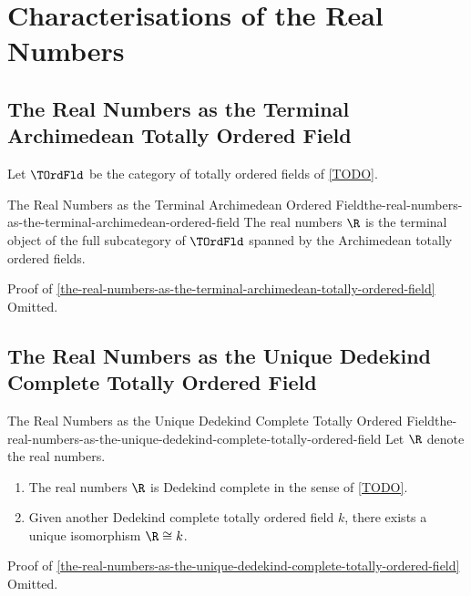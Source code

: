 \section{Characterisations of the Real Numbers}\label{section-characterisations-of-the-real-numbers}
\subsection{The Real Numbers as the Terminal Archimedean Totally Ordered Field}\label{subsection-the-real-numbers-as-the-terminal-archimedean-totally-ordered-field}
Let $\TOrdFld$ be the category of totally ordered fields of \cref{TODO}.
\begin{theorem}{The Real Numbers as the Terminal Archimedean Ordered Field}{the-real-numbers-as-the-terminal-archimedean-ordered-field}%
    The real numbers $\R$ is the terminal object of the full subcategory of $\TOrdFld$ spanned by the Archimedean totally ordered fields.
\end{theorem}
\begin{Proof}{Proof of \cref{the-real-numbers-as-the-terminal-archimedean-totally-ordered-field}}%
    Omitted.
\end{Proof}
\subsection{The Real Numbers as the Unique Dedekind Complete Totally Ordered Field}\label{subsection-the-real-numbers-as-the-unique-dedekind-complete-totally-ordered-field}
\begin{theorem}{The Real Numbers as the Unique Dedekind Complete Totally Ordered Field}{the-real-numbers-as-the-unique-dedekind-complete-totally-ordered-field}%
    Let $\R$ denote the real numbers.
    \begin{enumerate}
        \item\label{the-real-numbers-as-the-unique-dedekind-complete-ordered-field-1}The real numbers $\R$ is Dedekind complete in the sense of \cref{TODO}.
        \item\label{the-real-numbers-as-the-unique-dedekind-complete-ordered-field-2}Given another Dedekind complete totally ordered field $k$, there exists a unique isomorphism $\R\cong k$.
    \end{enumerate}
\end{theorem}
\begin{Proof}{Proof of \cref{the-real-numbers-as-the-unique-dedekind-complete-totally-ordered-field}}%
    Omitted.
\end{Proof}
